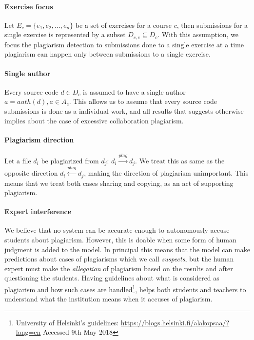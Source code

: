 \paragraph{Exercise focus} 
Let $E_c = \{e_1, e_2, ..., e_n\}$ be a set of exercises for a course $c$, then submissions for a single exercise is represented by a subset $D_{c,e} \subseteq D_c$. With this assumption, we focus the plagiarism detection to submissions done to a single exercise at a time \ie plagiarism can happen only between submissions to a single exercise.

\paragraph{Single author} 
Every source code $d \in D_c$ is assumed to have a single author $a = auth(d), a \in A_c$. This allows us to assume that every source code submissions is done as a individual work, and all results that suggests otherwise implies about the case of excessive collaboration \ie plagiarism. 

\paragraph{Plagiarism direction} 
Let a file $d_i$ be plagiarized from $d_j$: $d_i \xrightarrow{plag} d_j$. We treat this as same as the opposite direction $d_i \xleftarrow{plag} d_j$, making the direction of plagiarism unimportant. This means that we treat both cases sharing and copying, as an act of supporting plagiarism. 

\paragraph{Expert interference}
We believe that no system can be accurate enough to autonomously accuse students about plagiarism. However, this is doable when some form of human judgment is added to the model. In principal this means that the model can make predictions about cases of plagiarisms which we call \emph{suspects}, but the human expert must make the \emph{allegation} of plagiarism based on the results and after questioning the students. Having guidelines about what is considered as plagiarism and how such cases are handled\footnote{University of Helsinki's guidelines: \url{https://blogs.helsinki.fi/alakopsaa/?lang=en} Accessed 9th May 2018}, helps both students and teachers to understand what the institution means when it accuses of plagiarism. 




